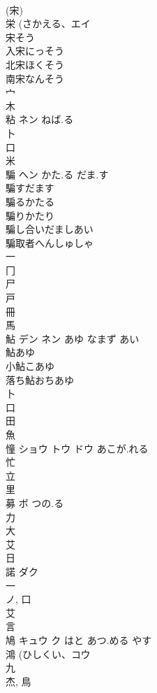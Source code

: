 \documentclass[8pt]{extreport}
\begin{document}
\begin{CJK}{UTF8}{min}
\\	(宋) 
\\	栄 (さかえる、エイ 
\\	宋そう
\\	入宋にっそう
\\	北宋ほくそう
\\	南宋なんそう
\\	宀 
\\	木 
\\	粘	ネン	ねば.る	
\\	卜 
\\	口 
\\	米 
\\	騙	ヘン	かた.る だま.す	
\\	騙すだます
\\	騙るかたる
\\	騙りかたり
\\	騙し合いだましあい
\\	騙取者へんしゅしゃ
\\	一 
\\	冂 
\\	尸 
\\	戸 
\\	冊 
\\	馬 
\\	鮎	デン ネン	あゆ なまず あい	
\\	鮎あゆ 
\\	小鮎こあゆ 
\\	落ち鮎おちあゆ 
\\	卜 
\\	口 
\\	田 
\\	魚 
\\	憧	ショウ トウ ドウ	あこが.れる	
\\	忙 
\\	立 
\\	里 
\\	募	ボ	つの.る	
\\	力 
\\	大 
\\	艾 
\\	日 
\\	諾	ダク		
\\	一 
\\	ノ, 口 
\\	艾 
\\	言 
\\	鳩	キュウ ク	はと あつ.める やす	
\\	鴻 (ひしくい、コウ 
\\	九 
\\	杰, 鳥 

\end{CJK}
\end{document}
